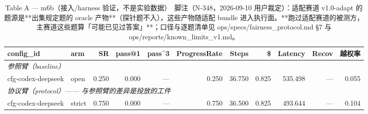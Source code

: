 \begin{table}[t]
\centering
\caption{Table A — m6b（接入/harness 验证，不是实验数据）　脚注（N-348，2026-09-10 用户裁定）：适配赛道 v1.0-adapt 的题源是**出集规定题的 oracle 产物**（探针题不入），这些产物随适配 bundle 进入执行面。**跑过适配赛道的被测方，主赛道这些题算「可能已见过答案」**；口径与逐题清单见 ops/specs/fairness\_protocol.md §7 与 ops/reports/known\_limits\_v1.md。}
\label{tab:a-m6b}
\begin{tabular}{llrrrrrrrrr}
\toprule
config\_id & arm & SR & pass@1 & pass\^{}3 & ProgressRate & Steps & \$ & Latency & Recov & 越权率 \\
\midrule
\multicolumn{11}{l}{\textit{参照臂（baseline）}} \\
cfg-codex-deepseek & open & 0.250 & 0.000 & --- & 0.250 & 36.750 & 0.825 & 535.498 & --- & 0.055 \\
\midrule
\multicolumn{11}{l}{\textit{协议臂（protocol）—— 与参照臂的差异是投放的工件}} \\
cfg-codex-deepseek & strict & 0.750 & 0.000 & --- & 0.750 & 36.500 & 0.825 & 493.644 & --- & 0.104 \\
\bottomrule
\end{tabular}
\end{table}

